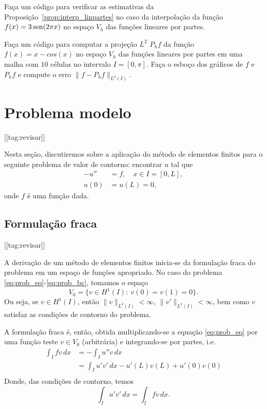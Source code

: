 \begin{exer}
  Faça um código para verificar as estimativas da Proposição~\ref{prop:interp_linpartes} no caso da interpolação da função $f(x) = 3\operatorname{sen}(2\pi x)$ no espaço $V_h$ das funções lineares por partes.
\end{exer}

\begin{exer}
  Faça um código para computar a projeção $L^2$ $P_hf$ da função $f(x) = x - cos(x)$ no espaço $V_h$ das funções lineares por partes em uma malha com $10$ células no intervalo $I = [0, \pi]$. Faça o esboço dos gráficos de $f$ e $P_hf$ e compute o erro $\|f-P_hf\|_{L^2(I)}$.
\end{exer}

\section{Problema modelo}\label{cap_mef1d_sec_modelo}
[[tag:revisar]]

Nesta seção, discutiremos sobre a aplicação do método de elementos finitos para o seguinte problema de valor de contorno: encontrar $u$ tal que
\begin{align}
  -u'' &= f,\quad x\in I=[0,L],\label{eq:prob_eq}\\
  u(0) &= u(L) = 0,\label{eq:prob_bc}
\end{align}
onde $f$ é uma função dada.

\subsection{Formulação fraca}
[[tag:revisar]]

A derivação de um método de elementos finitos inicia-se da formulação fraca do problema em um espaço de funções apropriado. No caso do problema \eqref{eq:prob_eq}-\eqref{eq:prob_bc}, tomamos o espaço
\begin{equation}
  V_0 = \{v\in H^1(I):~v(0)=v(1)=0\}.
\end{equation}
Ou seja, se $v\in H^1(I)$, então $\|v\|_{L^2(I)}<\infty$, $\|v'\|_{L^2(I)}<\infty$, bem como $v$ satisfaz as condições de contorno do problema.

A formulação fraca é, então, obtida multiplicando-se a equação \eqref{eq:prob_eq} por uma função teste $v\in V_0$ (arbitrária) e integrando-se por partes, i.e.
\begin{align}
  \int_I fv\,dx &= -\int_I u''v\,dx\\
  &= \int_I u'v'\,dx - u'(L)v(L) + u'(0)v(0)\\
\end{align}
Donde, das condições de contorno, temos
\begin{equation}
  \int_I u'v'\,dx = \int_I fv\,dx.
\end{equation}

